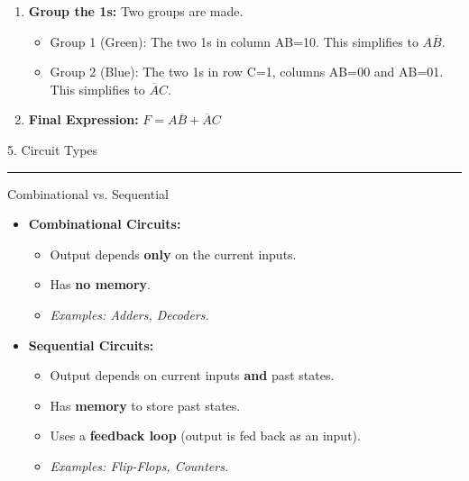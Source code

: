 \documentclass[a4paper, 8pt]{extarticle}
\newcommand{\sectionheading}[1]{%
  \par\vspace{0.7em}
  {\headingfont\fontsize{10.5pt}{11.5pt}\selectfont\color{black}#1}\par\nopagebreak
  \rule{\linewidth}{0.4pt}\vspace{0.2em}\nopagebreak
}
\newcommand{\subsectionheading}[1]{%
  \par\vspace{0.4em}\nopagebreak
  {\headingfont\fontsize{9pt}{10pt}\selectfont\color{black!80}#1}\par\nopagebreak\vspace{-0.3em}
}
\begin{document}
\begin{multicols}{3}
\begin{tcolorbox}[title=3-Variable K-Map Example]
\begin{enumerate}
    \item \textbf{Group the 1s:}
    Two groups are made.
    \begin{itemize}
        \item Group 1 (Green): The two 1s in column AB=10. This simplifies to $A\overline{B}$.
        \item Group 2 (Blue): The two 1s in row C=1, columns AB=00 and AB=01. This simplifies to $\overline{A}C$.
    \end{itemize}
    \item \textbf{Final Expression:} $F = A\overline{B} + \overline{A}C$
\end{enumerate}
\end{tcolorbox}

\columnbreak


\sectionheading{5. Circuit Types}
\subsectionheading{Combinational vs. Sequential}
\begin{itemize}
    \item \textbf{Combinational Circuits:}
        \begin{itemize}
            \item Output depends \textbf{only} on the current inputs.
            \item Has \textbf{no memory}.
            \item \textit{Examples: Adders, Decoders.}
        \end{itemize}
    \item \textbf{Sequential Circuits:}
        \begin{itemize}
            \item Output depends on current inputs \textbf{and} past states.
            \item Has \textbf{memory} to store past states.
            \item Uses a \textbf{feedback loop} (output is fed back as an input).
            \item \textit{Examples: Flip-Flops, Counters.}
        \end{itemize}
\end{itemize}


\end{multicols}
\end{document}
